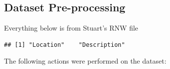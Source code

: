 \documentclass[10pt]{article}\usepackage[]{graphicx}\usepackage[]{color}
\makeatletter
\newenvironment{kframe}{%
 \def\at@end@of@kframe{}%
 \ifinner\ifhmode%
  \def\at@end@of@kframe{\end{minipage}}%
  \begin{minipage}{\columnwidth}%
 \fi\fi%
 \def\FrameCommand##1{\hskip\@totalleftmargin \hskip-\fboxsep
 \colorbox{shadecolor}{##1}\hskip-\fboxsep
     \hskip-\linewidth \hskip-\@totalleftmargin \hskip\columnwidth}%
 \MakeFramed {\advance\hsize-\width
   \@totalleftmargin\z@ \linewidth\hsize
   \@setminipage}}%
 {\par\unskip\endMakeFramed%
 \at@end@of@kframe}
\newenvironment{knitrout}{}{} %
\makeatother
\begin{document}
\subsection{Dataset Pre-processing}

Everything below is from Stuart's RNW file



\begin{knitrout}
\color{fgcolor}\begin{kframe}
\begin{verbatim}
## [1] "Location"    "Description"
\end{verbatim}
\end{kframe}
\end{knitrout}
The following actions were performed on the dataset:
\end{document}
